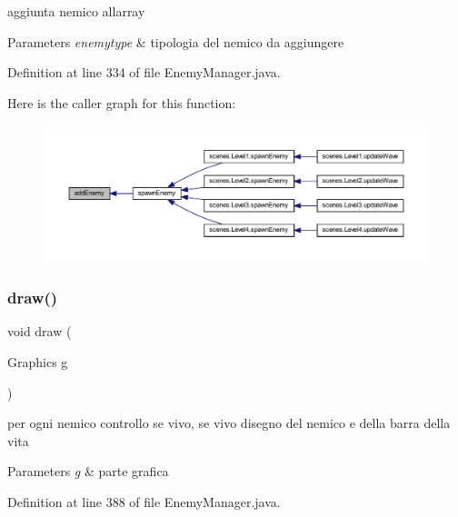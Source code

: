 aggiunta nemico all\textquotesingle{}array 


\begin{DoxyParams}{Parameters}
{\em enemytype} & tipologia del nemico da aggiungere \\
\hline
\end{DoxyParams}


Definition at line 334 of file Enemy\+Manager.\+java.

Here is the caller graph for this function\+:\nopagebreak
\begin{figure}[H]
\begin{center}
\leavevmode
\includegraphics[width=350pt]{classmanagers_1_1_enemy_manager_a24695d90cee943c6c64c2d9f1b231285_icgraph}
\end{center}
\end{figure}
\mbox{\label{classmanagers_1_1_enemy_manager_a72fe1ffca978e99fd16994a10e7f8051}} 
\subsubsection{\texorpdfstring{draw()}{draw()}}
{\footnotesize\ttfamily void draw (\begin{DoxyParamCaption}\item[{Graphics}]{g }\end{DoxyParamCaption})}



per ogni nemico controllo se vivo, se vivo disegno del nemico e della barra della vita 


\begin{DoxyParams}{Parameters}
{\em g} & parte grafica \\
\hline
\end{DoxyParams}


Definition at line 388 of file Enemy\+Manager.\+java.

